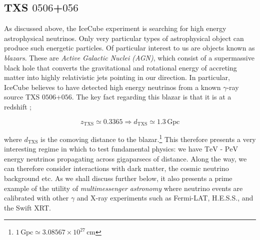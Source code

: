 \documentclass[10pt]{article}
\begin{document}
\subsection{TXS $0506$+$056$}
As discussed above, the IceCube experiment is searching for high energy astrophysical neutrinos. Only very particular types of astrophysical object can produce such energetic particles. Of particular interest to us are objects known as \textit{blazars}. These are \textit{Active Galactic Nuclei (AGN)}, which consist of a supermassive black hole that converts the gravitational and rotational energy of accreting matter into highly relativistic jets \cite{Ackermann2018} pointing in our direction. In particular, IceCube believes to have detected high energy neutrinos from a known $\gamma$-ray source TXS $0506$+$056$. The key fact regarding this blazar is that it is at a redshift \cite{Kelly};
\begin{framed}
\begin{equation}
  z_{\mathrm{TXS}} \simeq 0.3365 \Rightarrow d_{\mathrm{TXS}} \simeq 1.3 \, \textrm{Gpc}
\end{equation}
\end{framed}
\noindent where $d_{\mathrm{TXS}}$ is the comoving distance to the blazar.\footnote{$1\,\textrm{Gpc} \simeq 3.08567 \times 10^{27} \, \textrm{cm}$} This therefore presents a very interesting regime in which to test fundamental physics: we have $\textrm{TeV}$ - $\textrm{PeV}$ energy neutrinos propagating across gigaparsecs of distance. Along the way, we can therefore consider interactions with dark matter, the cosmic neutrino background etc. As we shall discuss further below, it also presents a prime example of the utility of \textit{multimessenger astronomy} \cite{Kellya, Ackermann2018} where neutrino events are calibrated with other $\gamma$ and X-ray experiments such as Fermi-LAT, H.E.S.S., and the Swift XRT.
\end{document}
